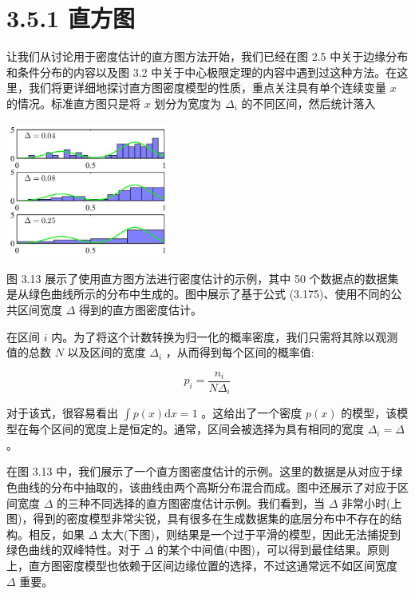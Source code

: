 \documentclass[10pt]{report}
\begin{document}
\section*{3.5.1 直方图}

让我们从讨论用于密度估计的直方图方法开始，我们已经在图 2.5 中关于边缘分布和条件分布的内容以及图 3.2 中关于中心极限定理的内容中遇到过这种方法。在这里，我们将更详细地探讨直方图密度模型的性质，重点关注具有单个连续变量 \(x\) 的情况。标准直方图只是将 \(x\) 划分为宽度为 \({\Delta }_{i}\) 的不同区间，然后统计落入

\begin{center}
\includegraphics[max width=0.4\textwidth]{images/0194e279-9b28-703a-88f4-c3ac21e2010d_118_942_368_548_453_0.jpg}
\end{center}
\hspace*{3em} 

图 3.13 展示了使用直方图方法进行密度估计的示例，其中 50 个数据点的数据集是从绿色曲线所示的分布中生成的。图中展示了基于公式 (3.175)、使用不同的公共区间宽度 \(\Delta\) 得到的直方图密度估计。

在区间 \(i\) 内。为了将这个计数转换为归一化的概率密度，我们只需将其除以观测值的总数 \(N\) 以及区间的宽度 \({\Delta }_{i}\) ，从而得到每个区间的概率值:

\[
{p}_{i} = \frac{{n}_{i}}{N{\Delta }_{i}} \tag{3.175}
\]

对于该式，很容易看出 \(\int p\left( x\right) \mathrm{d}x = 1\) 。这给出了一个密度 \(p\left( x\right)\) 的模型，该模型在每个区间的宽度上是恒定的。通常，区间会被选择为具有相同的宽度 \({\Delta }_{i} = \Delta\) 。

在图 3.13 中，我们展示了一个直方图密度估计的示例。这里的数据是从对应于绿色曲线的分布中抽取的，该曲线由两个高斯分布混合而成。图中还展示了对应于区间宽度 \(\Delta\) 的三种不同选择的直方图密度估计示例。我们看到，当 \(\Delta\) 非常小时(上图)，得到的密度模型非常尖锐，具有很多在生成数据集的底层分布中不存在的结构。相反，如果 \(\Delta\) 太大(下图)，则结果是一个过于平滑的模型，因此无法捕捉到绿色曲线的双峰特性。对于 \(\Delta\) 的某个中间值(中图)，可以得到最佳结果。原则上，直方图密度模型也依赖于区间边缘位置的选择，不过这通常远不如区间宽度 \(\Delta\) 重要。
\end{document}
